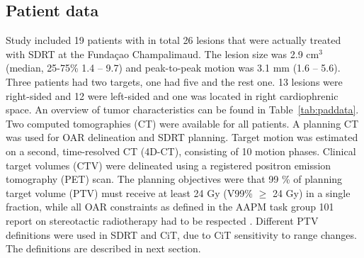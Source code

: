 \documentclass[type=dr, dr=rernat, accentcolor=tud7b,colorbacktitle, bigchapter, openright, twoside, 12pt ]{tudthesis}
\begin{document}
\subsection{Patient data}

Study included 19 patients with in total 26 lesions that were actually treated with SDRT at the Funda\c{c}ao Champalimaud. The lesion size was 2.9 cm$^3$ (median, 25-75\% 1.4 – 9.7) and peak-to-peak motion was 3.1 mm (1.6 – 5.6).
Three patients had two targets, one had five and the rest one. 13 lesions were right-sided and 12 were left-sided and one was located in right cardiophrenic space. An overview of tumor characteristics can be found in Table~\ref{tab:paddata}.
Two computed tomographies (CT) were available for all patients. A planning CT was used for OAR delineation and SDRT planning. Target motion was estimated on a second, time-resolved CT (4D-CT), consisting of 10 motion phases. 
Clinical target volumes (CTV) were delineated using a registered positron emission tomography (PET) scan. The planning objectives were that 99 \% of planning target volume (PTV) must receive at least 24 Gy (V99\% $\geq$ 24 Gy) 
in a single fraction, while all OAR constraints as defined in the AAPM task group 101 report on stereotactic radiotherapy had to be respected \cite{Benedict2010}. Different PTV definitions were used in SDRT and CiT, due to CiT sensitivity
to range changes. The definitions are described in next section.
\end{document}
